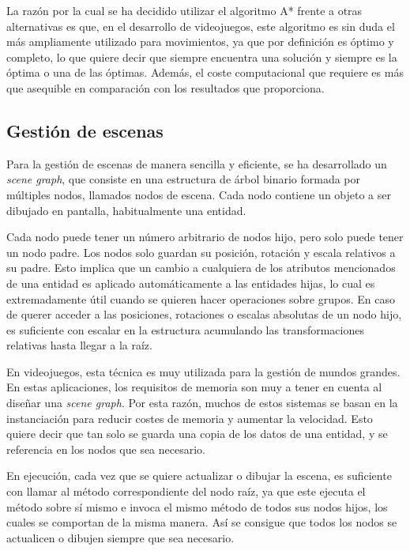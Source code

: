 		La razón por la cual se ha decidido utilizar el algoritmo A* frente a otras alternativas es que, en el desarrollo de videojuegos, este algoritmo es sin duda el más ampliamente utilizado para movimientos, ya que por definición es óptimo y completo, lo que quiere decir que siempre encuentra una solución y siempre es la óptima o una de las óptimas. Además, el coste computacional que requiere es más que asequible en comparación con los resultados que proporciona.

	\subsection{Gestión de escenas}

		Para la gestión de escenas de manera sencilla y eficiente, se ha desarrollado un \textit{scene graph}, que consiste en una estructura de árbol binario formada por múltiples nodos, llamados nodos de escena. Cada nodo contiene un objeto a ser dibujado en pantalla, habitualmente una entidad.

		Cada nodo puede tener un número arbitrario de nodos hijo, pero solo puede tener un nodo padre. Los nodos solo guardan su posición, rotación y escala relativos a su padre. Esto implica que un cambio a cualquiera de los atributos mencionados de una entidad es aplicado automáticamente a las entidades hijas, lo cual es extremadamente útil cuando se quieren hacer operaciones sobre grupos. En caso de querer acceder a las posiciones, rotaciones o escalas absolutas de un nodo hijo, es suficiente con escalar en la estructura acumulando las transformaciones relativas hasta llegar a la raíz.

		En videojuegos, esta técnica es muy utilizada para la gestión de mundos grandes. En estas aplicaciones, los requisitos de memoria son muy a tener en cuenta al diseñar una \textit{scene graph}. Por esta razón, muchos de estos sistemas se basan en la instanciación para reducir costes de memoria y aumentar la velocidad. Esto quiere decir que tan solo se guarda una copia de los datos de una entidad, y se referencia en los nodos que sea necesario.

		En ejecución, cada vez que se quiere actualizar o dibujar la escena, es suficiente con llamar al método correspondiente del nodo raíz, ya que este ejecuta el método sobre sí mismo e invoca el mismo método de todos sus nodos hijos, los cuales se comportan de la misma manera. Así se consigue que todos los nodos se actualicen o dibujen siempre que sea necesario.
